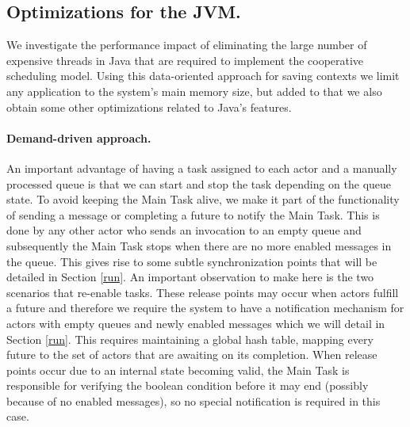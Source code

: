 \subsection{Optimizations for the JVM.}
\label{optimizations}
We investigate the performance impact of eliminating the large number of expensive threads in Java that are required to implement the cooperative scheduling model. Using this data-oriented approach for saving contexts we limit any application to the system's main memory size, but added to that we also obtain some other optimizations related to Java's features.

\paragraph{Demand-driven approach.}
An important advantage of having a task assigned to each actor and a manually processed queue is that we can start and stop the task depending on the queue state. To avoid keeping the Main Task alive, we make it part of the functionality of sending a message or completing a future to notify the Main Task. This is done by any other actor who sends an invocation to an empty queue and subsequently the Main Task stops when there are no more enabled messages in the queue. This gives rise to some subtle synchronization points that will be detailed in Section \ref{run}. An important observation to make here is the two scenarios that re-enable tasks. These release points may occur when actors fulfill a future and therefore we require the system to have a notification mechanism for actors with empty queues and newly enabled messages which we will detail in Section \ref{run}. This requires maintaining a global hash table, mapping every future to the set of actors that are awaiting on its completion. When release points occur due to an internal state becoming valid, the Main Task is responsible for verifying the boolean condition before it may end (possibly because of no enabled messages), so no special notification is required in this case.



